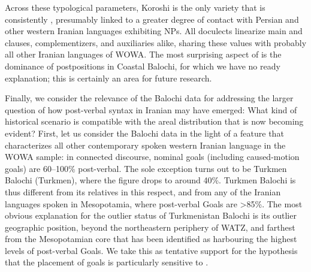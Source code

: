 \documentclass[output=paper,colorlinks,citecolor=brown,draftmode]{langscibook}
\begin{document}
Across these typological parameters, Koroshi is the only variety that is consistently , presumably linked to a greater degree of contact with Persian and other western Iranian languages exhibiting  NPs. All doculects linearize main and  clauses, complementizers, and auxiliaries alike, sharing these values with probably all other Iranian languages of WOWA. The most surprising aspect of  is the dominance of postpositions in Coastal Balochi, for which we have no ready explanation; this is certainly an area for future research.

Finally, we consider the relevance of the Balochi data for addressing the larger question of how post-verbal syntax in Iranian may have emerged: What kind of historical scenario is compatible with the areal distribution that is now becoming evident? First, let us consider the Balochi data in the light of a feature that characterizes all other contemporary spoken western Iranian language in the WOWA sample: in connected discourse, nominal goals (including caused-motion goals) are 60--100\% post-verbal. The sole exception turns out to be Turkmen Balochi (Turkmen), where the figure drops to around 40\%. Turkmen Balochi is thus different from its relatives in this respect, and from any of the Iranian languages spoken in Mesopotamia, where post-verbal Goals are >85\%. The most obvious explanation for the outlier status of Turkmenistan Balochi is its outlier geographic position, beyond the northeastern periphery of WATZ, and farthest from the Mesopotamian core that has been identified as harbouring the highest levels of post-verbal Goals. We take this as tentative support for the hypothesis that the placement of goals is particularly sensitive to .
\end{document}
